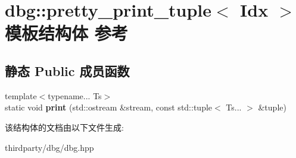 \hypertarget{structdbg_1_1pretty__print__tuple}{}\section{dbg\+:\+:pretty\+\_\+print\+\_\+tuple$<$ Idx $>$ 模板结构体 参考}
\label{structdbg_1_1pretty__print__tuple}
\subsection*{静态 Public 成员函数}
\begin{DoxyCompactItemize}
\item 
\mbox{\label{structdbg_1_1pretty__print__tuple_a17c2bca6c330e88da2082efa4c3a9be5}} 
{\footnotesize template$<$typename... Ts$>$ }\\static void {\bfseries print} (std\+::ostream \&stream, const std\+::tuple$<$ Ts... $>$ \&tuple)
\end{DoxyCompactItemize}


该结构体的文档由以下文件生成\+:\begin{DoxyCompactItemize}
\item 
thirdparty/dbg/dbg.\+hpp\end{DoxyCompactItemize}
